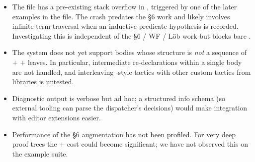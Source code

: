 \begin{itemize}
  \item The  file
    has a pre-existing stack overflow in
    , triggered by one of the later examples
    in the file. The crash predates the §6 work and likely involves
    infinite term traversal when an inductive-predicate hypothesis is
    recorded. Investigating this is independent of the §6 / WF / Löb
    work but blocks bare .

  \item The system does not yet support  bodies whose
    structure is \emph{not} a sequence of  \(+\)
     \(+\) leaves. In particular, intermediate 
    re-declarations within a single body are not handled, and
    interleaving -style tactics with other custom
    tactics from libraries is untested.

  \item Diagnostic output is verbose but ad hoc; a structured
     info schema (so external tooling can parse the
    dispatcher's decisions) would make integration with editor extensions
    easier.

  \item Performance of the §6 augmentation has not been profiled. For
    very deep proof trees the  \(+\)
     cost could become significant; we have not
    observed this on the example suite.
\end{itemize}
